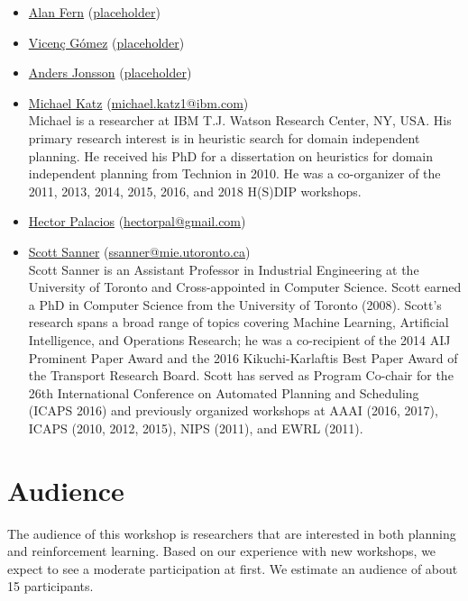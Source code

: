 \documentclass[10pt]{article}
\begin{document}
\begin{itemize}

\item \href{placeholder}{Alan Fern}
  (\href{mailto:placeholder}{placeholder})\\
  


\item \href{placeholder}{Vicen\c{c} G\'{o}mez}
  (\href{mailto:placeholder}{placeholder})\\



\item \href{placeholder}{Anders Jonsson}
  (\href{mailto:placeholder}{placeholder})\\
  
  
\item \href{https://resedit.watson.ibm.com/researcher/view.php?person=ibm-Michael.Katz1}{Michael Katz}
 (\href{mailto:michael.katz1@ibm.com}{michael.katz1@ibm.com})\\
 Michael is a researcher at IBM T.J. Watson Research Center, NY, USA. His
 primary research interest is in heuristic search for domain independent planning.
 He received his PhD for a dissertation on heuristics for domain independent
 planning from Technion in 2010.
 He was a co-organizer of the 2011, 2013, 2014, 2015, 2016, and 2018 H(S)DIP
 workshops.


\item \href{http://hectorpalacios.net/}{Hector Palacios}
  (\href{mailto:hectorpal@gmail.com}{hectorpal@gmail.com})\\

\item \href{http://d3m.mie.utoronto.ca}{Scott Sanner}
  (\href{mailto:ssanner@mie.utoronto.ca}{ssanner@mie.utoronto.ca})\\
Scott Sanner is an Assistant Professor in Industrial Engineering at the
University of Toronto and Cross-appointed in Computer Science.  Scott earned a
PhD in Computer Science from the University of Toronto (2008).  Scott’s research
spans a broad range of topics covering Machine Learning, Artificial
Intelligence, and Operations Research; he was a co-recipient of the 2014 AIJ
Prominent Paper Award and the 2016 Kikuchi-Karlaftis Best Paper Award of the
Transport Research Board.  Scott has served as Program Co-chair for the 26th
International Conference on Automated Planning and Scheduling (ICAPS 2016) and
previously organized workshops at AAAI (2016, 2017), ICAPS (2010, 2012, 2015),
NIPS (2011), and EWRL (2011).
  





  
\end{itemize}

\section*{Audience}

The audience of this workshop is researchers that are interested in both
planning and reinforcement learning.
%
Based on our experience with new workshops, we expect to see a moderate
participation at first. We estimate an audience of about 15 participants.  
\end{document}
